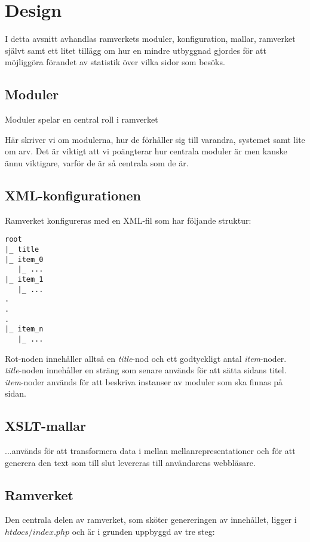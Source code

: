 \section{Design}
I detta avsnitt avhandlas ramverkets moduler, konfiguration, mallar, ramverket
självt samt ett litet tillägg om hur en mindre utbyggnad gjordes för att
möjliggöra förandet av statistik över vilka sidor som besöks.

\subsection{Moduler}
Moduler spelar en central roll i ramverket 

Här skriver vi om modulerna, hur de förhåller sig till varandra, systemet samt
lite om arv. Det är viktigt att vi poängterar hur centrala moduler är men kanske
ännu viktigare, varför de är så centrala som de är.

\subsection{XML-konfigurationen}
Ramverket konfigureras med en XML-fil som har följande struktur:

\begin{verbatim}
root
|_ title
|_ item_0
   |_ ...
|_ item_1
   |_ ...
.
.
.
|_ item_n
   |_ ...
\end{verbatim}

Rot-noden innehåller alltså en {\it title}-nod och ett godtyckligt antal
{\it item}-noder. {\it title}-noden innehåller en sträng som senare används för
att sätta sidans titel. {\it item}-noder används för att beskriva instanser av
moduler som ska finnas på sidan.

\subsection{XSLT-mallar}
...används för att transformera data i mellan mellanrepresentationer och för att
generera den text som till slut levereras till användarens webbläsare.

\subsection{Ramverket}
Den centrala delen av ramverket, som sköter genereringen av innehållet, ligger
i $htdocs/index.php$ och är i grunden uppbyggd av tre steg:

